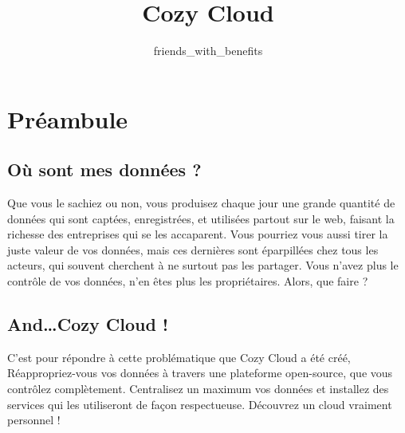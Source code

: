 \documentclass{42-fr}
\begin{document}
                           \title{Cozy Cloud}
                          \subtitle{friends\_with\_benefits}


\maketitle

\tableofcontents


\chapter{Préambule}


	\section{O\`u sont mes donn\'ees ?}

		Que vous le sachiez ou non, vous produisez chaque jour une grande quantit\'e de donn\'ees
		qui sont capt\'ees, enregistr\'ees, et utilis\'ees partout sur le web, faisant
		la richesse des entreprises qui se les accaparent. Vous pourriez vous aussi
		tirer la juste valeur de vos donn\'ees, mais ces dernières sont \'eparpill\'ees
		chez tous les acteurs, qui souvent cherchent \`a ne surtout pas les partager.
		Vous n'avez plus le contrôle de vos donn\'ees, n'en \^etes plus les propri\'etaires.
		Alors, que faire ?


	\section{And…Cozy Cloud !}

		C'est pour r\'epondre \`a cette probl\'ematique que Cozy Cloud a \'et\'e  cr\'e\'e,
		R\'eappropriez-vous vos donn\'ees à travers une plateforme open-source, que vous contr\^olez
		compl\`etement. Centralisez un maximum vos donn\'ees et installez des services
		qui les utiliseront de façon respectueuse. D\'ecouvrez un cloud vraiment personnel !
\end{document}
